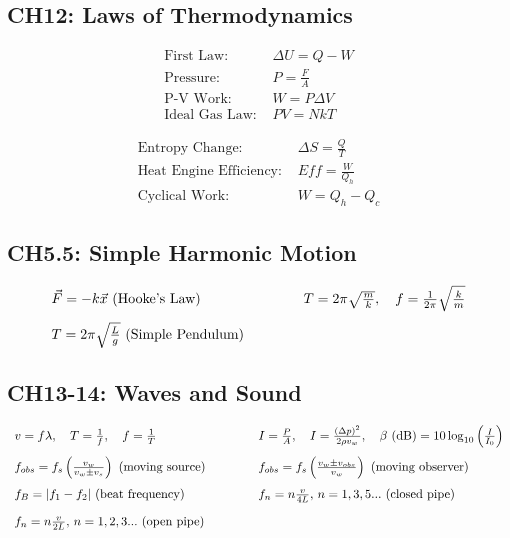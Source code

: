 \documentclass[12pt,a4paper]{article}
\begin{document}
\subsection{CH12: Laws of Thermodynamics}
\begin{multicols}{2}
\begin{align*}
\text{First Law: } & \Delta U = Q - W \\
\text{Pressure: } & P = \frac{F}{A} \\
\text{P-V Work: } & W = P\Delta V \\
\text{Ideal Gas Law: } & PV = NkT 
\end{align*}

\columnbreak

\begin{align*}
\text{Entropy Change: } & \Delta S = \frac{Q}{T} \\
\text{Heat Engine Efficiency: } & Eff = \frac{W}{Q_h} \\
\text{Cyclical Work: } & W = Q_h - Q_c
\end{align*}
\end{multicols}

\subsection{CH5.5: Simple Harmonic Motion}
\begin{align*}
\begin{array}{l@{\hspace{1.5cm}}l}
\vec{F} = -k\vec{x} \text{ (Hooke's Law)} & T = 2\pi\sqrt{\frac{m}{k}}, \quad f = \frac{1}{2\pi}\sqrt{\frac{k}{m}} \\[1em] 
T = 2\pi\sqrt{\frac{L}{g}} \text{ (Simple Pendulum)} & \\
\end{array}
\end{align*}

\subsection{CH13-14: Waves and Sound}
\begin{align*}
\begin{array}{l@{\hspace{1.5cm}}l}
v = f\lambda, \quad T = \frac{1}{f}, \quad f = \frac{1}{T} & I = \frac{P}{A}, \quad I = \frac{(\Delta p)^2}{2\rho v_w}, \quad \beta \text{ (dB)} = 10\log_{10}\left(\frac{I}{I_0}\right) \\[1em]
f_{obs} = f_s\left(\frac{v_w}{v_w \pm v_s}\right) \text{ (moving source)} & f_{obs} = f_s\left(\frac{v_w \pm v_{obs}}{v_w}\right) \text{ (moving observer)} \\[1em]
f_B = |f_1 - f_2| \text{ (beat frequency)} & f_n = n\frac{v}{4L}, \, n = 1,3,5... \text{ (closed pipe)} \\[1em]
f_n = n\frac{v}{2L}, \, n = 1,2,3... \text{ (open pipe)} & \\
\end{array}
\end{align*}
\end{document}
